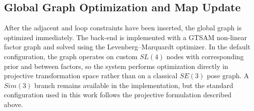 \subsection{Global Graph Optimization and Map Update}
After the adjacent and loop constraints have been inserted, the global graph is optimized immediately. The back-end is implemented with a GTSAM non-linear factor graph and solved using the Levenberg--Marquardt optimizer. In the default configuration, the graph operates on custom $SL(4)$ nodes with corresponding prior and between factors, so the system performs optimization directly in projective transformation space rather than on a classical $SE(3)$ pose graph. A $Sim(3)$ branch remains available in the implementation, but the standard configuration used in this work follows the projective formulation described above.

